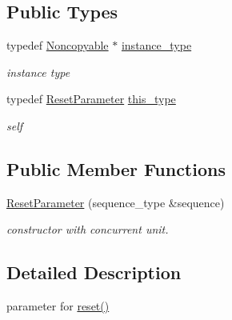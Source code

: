 \subsection*{Public Types}
\begin{DoxyCompactItemize}
\item 
\hypertarget{classhryky_1_1_noncopyable_aaf87abb55f700af85ecb0895f6178821}{typedef \hyperlink{classhryky_1_1_noncopyable}{Noncopyable} $\ast$ \hyperlink{classhryky_1_1_noncopyable_aaf87abb55f700af85ecb0895f6178821}{instance\-\_\-type}}\label{classhryky_1_1_noncopyable_aaf87abb55f700af85ecb0895f6178821}

\begin{DoxyCompactList}\small\item\em instance type \end{DoxyCompactList}\item 
\hypertarget{structhryky_1_1task_1_1worker_1_1_base_1_1_reset_parameter_a44462519af461afb9deaba78f71d0ae8}{typedef \hyperlink{structhryky_1_1task_1_1worker_1_1_base_1_1_reset_parameter}{Reset\-Parameter} \hyperlink{structhryky_1_1task_1_1worker_1_1_base_1_1_reset_parameter_a44462519af461afb9deaba78f71d0ae8}{this\-\_\-type}}\label{structhryky_1_1task_1_1worker_1_1_base_1_1_reset_parameter_a44462519af461afb9deaba78f71d0ae8}

\begin{DoxyCompactList}\small\item\em self \end{DoxyCompactList}\end{DoxyCompactItemize}
\subsection*{Public Member Functions}
\begin{DoxyCompactItemize}
\item 
\hyperlink{structhryky_1_1task_1_1worker_1_1_base_1_1_reset_parameter_aa91b63615964cc6d6b3a9507fa06cdef}{Reset\-Parameter} (sequence\-\_\-type \&sequence)
\begin{DoxyCompactList}\small\item\em constructor with concurrent unit. \end{DoxyCompactList}\end{DoxyCompactItemize}


\subsection{Detailed Description}
parameter for \hyperlink{classhryky_1_1task_1_1worker_1_1_base_a2dfa3093b3165d58ed31aa575ae1b159}{reset()} 

